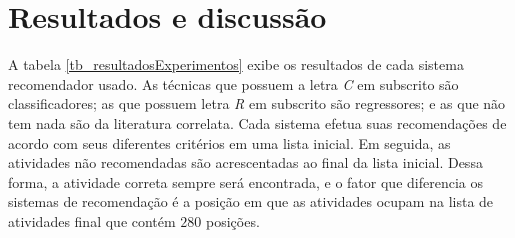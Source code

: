 \documentclass[10pt,letterpaper]{article}
\begin{document}
\section*{Resultados e discussão}
A tabela \ref{tb_resultadosExperimentos} exibe os resultados de cada sistema recomendador usado. As técnicas que possuem a letra \emph{C} em subscrito são classificadores; as que possuem letra \emph{R} em subscrito são regressores; e as que não tem nada são da literatura correlata. Cada sistema efetua suas recomendações de acordo com seus diferentes critérios em uma lista inicial. Em seguida, as atividades não recomendadas são acrescentadas ao final da lista inicial. Dessa forma, a atividade correta sempre será encontrada, e o fator que diferencia os sistemas de recomendação é a posição em que as atividades ocupam na lista de atividades final que contém \(280\) posições.
\bgroup
\end{document}
